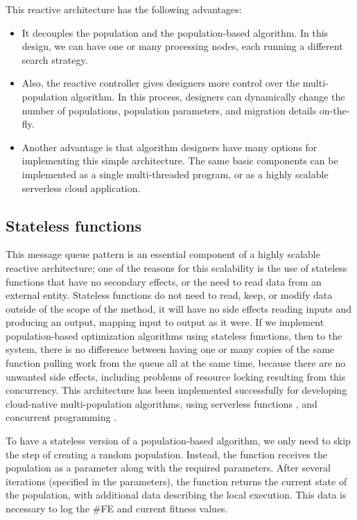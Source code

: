 \documentclass[runningheads]{llncs}
\begin{document}
This reactive architecture has the following advantages:
\begin{itemize}

\item It decouples the population and the population-based algorithm. In this
design, we can have one or many processing nodes, each running a different
search strategy.

\item Also, the reactive controller gives designers more control over the
multi-population algorithm. In this process, designers can dynamically change
the number of populations, population parameters, and migration details
on-the-fly.

\item Another advantage is that algorithm designers have many options for
implementing this simple architecture. The same basic components can be
implemented as a single multi-threaded program, or as a highly scalable
serverless cloud application.
\end{itemize}

\subsection{Stateless functions} 
\label{functions} 

This message queue pattern is an essential component of a highly scalable
reactive architecture; one of the reasons for this scalability is the use of
stateless functions that have no secondary effects, or the need to read data
from an external entity. Stateless functions do not need to read, keep, or
modify data outside of the scope of the method, it will have no side
effects reading inputs and producing an output, mapping input to output
as it were. If we implement population-based
optimization algorithms using stateless functions, then to the system, there is
no difference between having one or many copies of the same function pulling
work from the queue all at the same time, because there are no unwanted side
effects, including problems of resource locking resulting from this
concurrency. This architecture has been implemented successfully for 
developing cloud-native multi-population algorithms,
using serverless functions \cite{garcia2018modern}, and concurrent programming \cite{guervos2019improving}.  

To have a stateless version of a population-based algorithm, we only need to
skip the step of creating a random population. Instead, the function receives
the population as a parameter along with the required parameters. After several
iterations (specified in the parameters), the function returns the current state
of the population, with additional data describing the local execution. This
data is necessary to log the \#FE and current fitness values.
\end{document}
